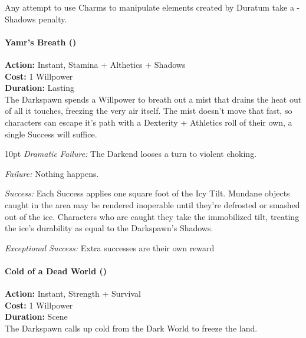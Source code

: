 Any attempt to use Charms to manipulate elements created by Duratum take a -Shadows penalty. 

\paragraph*{Yamr’s Breath (\textbullet\textbullet)}

\noindent \textbf{Action:} Instant, Stamina + Althetics + Shadows\\

\noindent \textbf{Cost:} 1 Willpower\\

\noindent \textbf{Duration:} Lasting \\

The Darkspawn spends a Willpower to breath out a mist that drains the heat out of all it touches, freezing the very air itself. The mist doesn’t move that fast, so characters can escape it’s path with a Dexterity + Athletics roll of their own, a single Success will suffice.

\begin{myindentpar}{10pt} \emph{Dramatic Failure:} The Darkend looses a turn to violent choking.

    \emph{Failure:} Nothing happens. 

    \emph{Success:}  Each Success applies one square foot of the Icy Tilt. Mundane objects caught in the area may be rendered inoperable until they’re defrosted or smashed out of the ice. Characters who are caught they take the immobilized tilt, treating the ice’s durability as equal to the Darkspawn’s Shadows. 

    \emph{Exceptional Success:} Extra successes are their own reward\end{myindentpar}


\paragraph*{Cold of a Dead World (\textbullet\textbullet\textbullet)}

\noindent \textbf{Action:} Instant, Strength + Survival\\

\noindent \textbf{Cost:} 1 Willpower\\

\noindent \textbf{Duration:} Scene \\

The Darkspawn calls up cold from the Dark World to freeze the land. 

